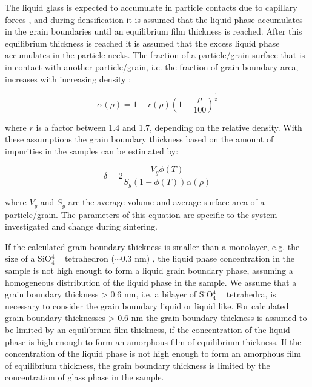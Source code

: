 The liquid glass is expected to accumulate in particle contacts due to capillary forces \cite{Shaw1986}, and during densification it is assumed that the liquid phase accumulates in the grain boundaries until an equilibrium film thickness \cite{Subramaniam2006} is reached. After this equilibrium thickness is reached it is assumed that the excess liquid phase accumulates in the particle necks. The fraction of a particle/grain surface that is in contact with another particle/grain, i.e. the fraction of grain boundary area, increases with increasing density \cite{German2016}:

\begin{equation}
\label{Ch4-eq: eq1}
\alpha(\rho) = 1 - r(\rho) \left(1-\frac{\rho}{100} \right)^{\frac{1}{2}}
\end{equation}

\noindent where $r$ is a factor between 1.4 and 1.7, depending on the relative density. With these assumptions the grain boundary thickness based on the amount of impurities in the samples can be estimated by:

\begin{equation}
\label{Ch4-eq: eq2}
\delta = 2 \frac{V_{g}\phi (T)}{S_{g}\left(1-\phi(T)\right)\alpha(\rho)}
\end{equation}

\noindent where $V_{g}$ and $S_{g}$ are the average volume and average surface area of a particle/grain. The parameters of this equation are specific to the system investigated and change during sintering.

If the calculated grain boundary thickness is smaller than a monolayer, e.g. the size of a SiO$_{4}^{4-}$ tetrahedron ($\sim$0.3 nm) \cite{Clarke1987}, the liquid phase concentration in the sample is not high enough to form a liquid grain boundary phase, assuming a homogeneous distribution of the liquid phase in the sample. We assume that a grain boundary thickness > 0.6 nm, i.e. a bilayer of SiO$_{4}^{4-}$ tetrahedra, is necessary to consider the grain boundary liquid or liquid like. For calculated grain boundary thicknesses > 0.6 nm the grain boundary thickness is assumed to be limited by an equilibrium film thickness, if the concentration of the liquid phase is high enough to form an amorphous film of equilibrium thickness. If the concentration of the liquid phase is not high enough to form an amorphous film of equilibrium thickness, the grain boundary thickness is limited by the concentration of glass phase in the sample.


